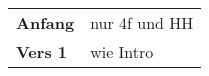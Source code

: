
\begin{tabular}{p{1.6cm}l}
	\textbf{Anfang} & nur 4f und HH \\
	\textbf{Vers 1} & wie Intro     \\
\end{tabular}
